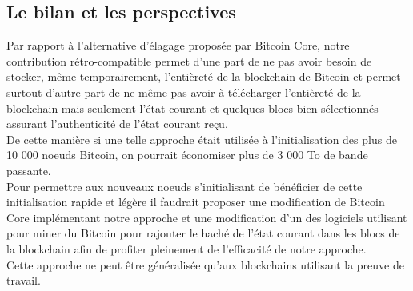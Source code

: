 \documentclass{article}
\newenvironment{point}[1]%
{\subsection*{#1}}%
{}
\begin{document}
\begin{point}{Le bilan et les perspectives}
  
	Par rapport à l'alternative d'élagage proposée par Bitcoin Core, notre contribution rétro-compatible permet d'une part de ne pas avoir besoin de stocker, même temporairement, l'entièreté de la blockchain de Bitcoin et permet surtout d'autre part de ne même pas avoir à télécharger l'entièreté de la blockchain mais seulement l'état courant et quelques blocs bien sélectionnés assurant l'authenticité de l'état courant reçu.\\
	De cette manière si une telle approche était utilisée à l'initialisation des plus de 10 000 noeuds Bitcoin, on pourrait économiser plus de 3 000 To de bande passante.\\
	Pour permettre aux nouveaux noeuds s'initialisant de bénéficier de cette initialisation rapide et légère il faudrait proposer une modification de Bitcoin Core implémentant notre approche et une modification d'un des logiciels utilisant pour miner du Bitcoin pour rajouter le haché de l'état courant dans les blocs de la blockchain afin de profiter pleinement de l'efficacité de notre approche.\\
	Cette approche ne peut être généralisée qu'aux blockchains utilisant la preuve de travail.\\
	

\end{point}
\end{document}

